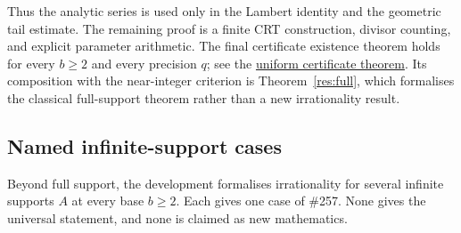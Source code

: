 \documentclass[11pt]{article}
\newcommand{\commit}{ebc98ee71f6819bd9fe344a0bb343542c604e533}
\newcommand{\repobase}{https://github.com/wcook04/plectis-lean-erdos249-257/blob/\commit}
\newcommand{\PK}{Erdos249257}
\newcommand{\lword}[4]{\href{\repobase/\PK/#1\#L#2}{#4}}
\theoremstyle{definition}
\theoremstyle{remark}
\begin{document}
Thus the analytic series is used only in the Lambert identity and the
geometric tail estimate.  The remaining proof is a finite CRT construction,
divisor counting, and explicit parameter arithmetic.  The final certificate
existence theorem holds for every $b\geq2$ and every precision $q$; see the
\lword{CertificateKernel.lean}{7859}{exists_weighted_block_certificates}{uniform certificate theorem}.
Its composition with the near-integer criterion is
Theorem~\ref{res:full}, which formalises the classical full-support theorem rather than a new
irrationality result.

\subsection{Named infinite-support cases}

Beyond full support, the development formalises irrationality for several
infinite supports $A$ at every base $b\ge2$.  Each gives one case of \#257.
None gives the universal statement, and none is claimed as new mathematics.
\end{document}
